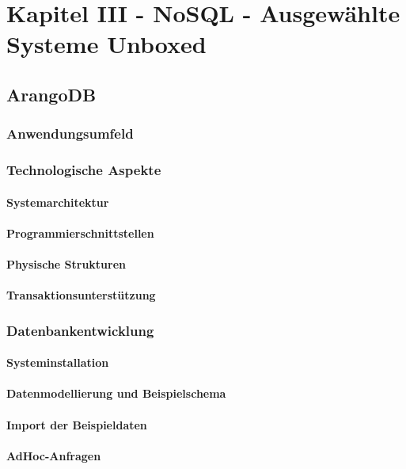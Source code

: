 \chapter{Kapitel III - NoSQL - Ausgewählte Systeme Unboxed}
\setcounter{section}{7}
\section{ArangoDB}
\subsection{Anwendungsumfeld}

\subsection{Technologische Aspekte}
\subsubsection{Systemarchitektur}
\subsubsection{Programmierschnittstellen}
\subsubsection{Physische Strukturen}
\subsubsection{Transaktionsunterstützung}

\subsection{Datenbankentwicklung}
\subsubsection{Systeminstallation}
\subsubsection{Datenmodellierung und Beispielschema}
\subsubsection{Import der Beispieldaten}
\subsubsection{AdHoc-Anfragen}